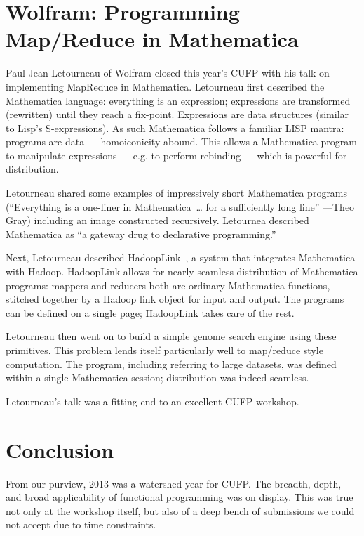 \documentclass{jfp1}
\begin{document}
\section{Wolfram: Programming Map/Reduce in Mathematica}


Paul-Jean Letourneau of Wolfram closed this year's CUFP with his talk
on implementing MapReduce in Mathematica. Letourneau first described
the Mathematica language: everything is an expression; expressions are
transformed (rewritten) until they reach a fix-point. Expressions are
data structures (similar to Lisp's S-expressions).  As such Mathematica
follows a familiar LISP mantra: programs are data --- homoiconicity
abound. This allows a Mathematica program to manipulate expressions
--- e.g. to perform rebinding --- which is powerful for distribution.

Letourneau shared some examples of impressively short Mathematica
programs (``Everything is a one-liner in Mathematica~\ldots{} for a sufficiently
long line'' ---Theo Gray) including an image constructed recursively. 
Letournea described Mathematica as ``a gateway drug to declarative
programming.''

Next, Letourneau described
HadoopLink~\cite{Letourneau:2013:HadoopLink}, a system that integrates
Mathematica with Hadoop. HadoopLink allows for nearly seamless
distribution of Mathematica programs: mappers and reducers both are
ordinary Mathematica functions, stitched together by a Hadoop link
object for input and output. The programs can be defined on a single
page; HadoopLink takes care of the rest.

Letourneau then went on to build a simple genome search engine using
these primitives.  This problem lends itself particularly well to map/reduce
style computation. The program, including referring to large datasets,
was defined within a single Mathematica session; distribution was indeed
seamless.

Letourneau's talk was a fitting end to an excellent CUFP workshop.

\section{Conclusion}

From our purview, 2013 was a watershed year for CUFP. The breadth,
depth, and broad applicability of functional programming was on
display. This was true not only at the workshop itself, but also of a
deep bench of submissions we could not accept due to time constraints.
\end{document}
